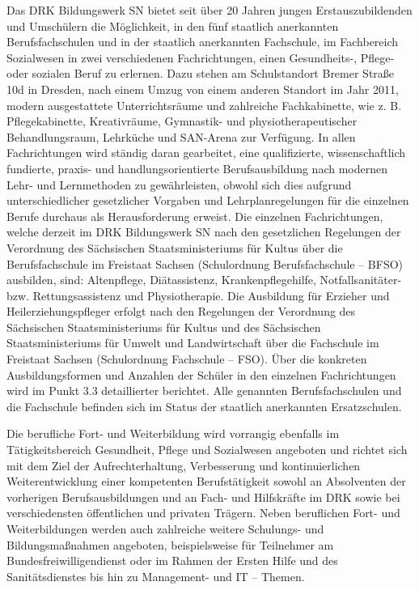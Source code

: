 Das DRK Bildungswerk SN bietet seit über 20 Jahren jungen Erstauszubildenden und  Umschülern die Möglichkeit, in den fünf staatlich anerkannten Berufsfachschulen und in der staatlich anerkannten Fachschule, im Fachbereich Sozialwesen in zwei verschiedenen Fachrichtungen, einen Gesundheits-, Pflege- oder sozialen Beruf zu erlernen. Dazu stehen am Schulstandort Bremer Straße 10d in Dresden, nach einem Umzug von einem anderen Standort im Jahr 2011, modern ausgestattete Unterrichtsräume und zahlreiche Fachkabinette, wie z. B. Pflegekabinette, Kreativräume, Gymnastik- und physiotherapeutischer Behandlungsraum, Lehrküche und SAN-Arena zur Verfügung. In allen Fachrichtungen wird ständig daran gearbeitet, eine qualifizierte, wissenschaftlich fundierte, praxis- und handlungsorientierte Berufsausbildung nach modernen Lehr- und Lernmethoden zu gewährleisten, obwohl sich dies aufgrund unterschiedlicher gesetzlicher Vorgaben und Lehrplanregelungen für die einzelnen Berufe durchaus als Herausforderung erweist. Die einzelnen Fachrichtungen, welche derzeit im DRK Bildungswerk SN nach den gesetzlichen Regelungen der Verordnung des Sächsischen Staatsministeriums für Kultus über die Berufsfachschule im Freistaat Sachsen (Schulordnung Berufsfachschule -- BFSO) ausbilden, sind: Altenpflege, Diätassistenz, Krankenpflegehilfe, Notfallsanitäter- bzw. Rettungsassistenz und Physiotherapie. Die Ausbildung für Erzieher und Heilerziehungspfleger erfolgt nach den Regelungen der Verordnung des Sächsischen Staatsministeriums für Kultus und des Sächsischen Staatsministeriums für Umwelt und Landwirtschaft über die Fachschule im Freistaat Sachsen (Schulordnung Fachschule – FSO). Über die konkreten Ausbildungsformen und Anzahlen der Schüler in den einzelnen Fachrichtungen wird im Punkt 3.3 detaillierter berichtet. Alle genannten Berufsfachschulen und die Fachschule befinden sich im Status der staatlich anerkannten Ersatzschulen.

Die berufliche Fort- und Weiterbildung wird vorrangig ebenfalls im Tätigkeitsbereich Gesundheit, Pflege und Sozialwesen angeboten und richtet sich mit dem Ziel der Aufrechterhaltung, Verbesserung und kontinuierlichen Weiterentwicklung einer kompetenten Berufstätigkeit sowohl an Absolventen der vorherigen Berufsausbildungen und an Fach- und Hilfskräfte im DRK sowie bei verschiedensten öffentlichen und privaten Trägern. Neben beruflichen Fort- und Weiterbildungen werden auch zahlreiche weitere Schulungs- und Bildungsmaßnahmen angeboten, beispielsweise für Teilnehmer am Bundesfreiwilligendienst oder im Rahmen der Ersten Hilfe und des Sanitätsdienstes bis hin zu Management- und IT -- Themen. 

